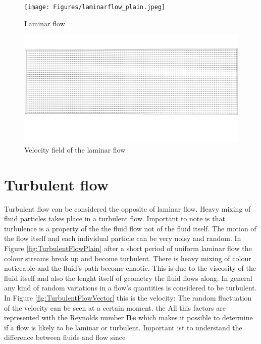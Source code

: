 \begin{figure}[htp]
\centering
\texttt{[image: Figures/laminarflow\_plain.jpeg]}
\caption{Laminar flow}
\label{fig:LaminarFlowPlain}
\end{figure}

\begin{figure}[htp]
\centering
\includegraphics[scale=0.05]{Figures/laminarflow_vectors.png}
\caption{Velocity field of the laminar flow}
\label{LaminarFlowVector}
\end{figure}



\section{Turbulent flow}

Turbulent flow can be considered the opposite of laminar flow. Heavy mixing of fluid particles takes place in a turbulent flow. Important to note is that turbulence is a property of the the fluid flow not of the fluid itself. The motion of the flow itself and
each individual particle can be very noisy and random. In Figure \ref{fig:TurbulentFlowPlain} after a short period of uniform laminar flow the colour streams break up
and become turbulent. There is heavy mixing of colour noticeable and the fluid's path become chaotic. This is due to the viscosity of the fluid itself and also the lenght itself of geometry the fluid
flows along. In general any kind of random variations in a flow's quantities is considered to be turbulent. In Figure \ref{fig:TurbulentFlowVector} this is the velocity: The random fluctuation of the velocity can be seen at a certain moment. the All this factors are represented with the Reynolds number \textbf{Re} which makes it possible to determine if a flow is likely to be laminar or
turbulent. Important ist to understand the difference between fluids and flow since 



